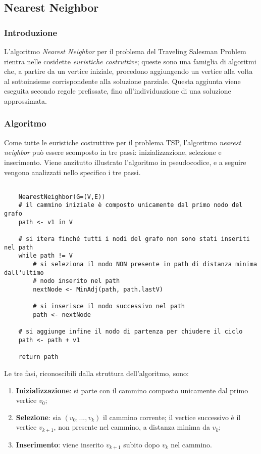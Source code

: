 \subsection{Nearest Neighbor}

\subsubsection{Introduzione}

L'algoritmo \textit{Nearest Neighbor} per il problema del Traveling Salesman Problem rientra nelle cosidette \textit{euristiche costruttive}; queste sono una famiglia di algoritmi che, a partire da un vertice iniziale, procedono aggiungendo un vertice alla volta al sottoinsieme corrispondente alla soluzione parziale. Questa aggiunta viene eseguita secondo regole prefissate, fino all'individuazione di una soluzione approssimata.

\subsubsection{Algoritmo}

Come tutte le euristiche costruttive per il problema TSP, l'algoritmo \textit{nearest neighbor} può essere scomposto in tre passi: inizializzazione, selezione e inserimento. Viene anzitutto illustrato l'algoritmo in pseudocodice, e a seguire vengono analizzati nello specifico i tre passi.

\begin{verbatim}

    NearestNeighbor(G=(V,E))
    # il cammino iniziale è composto unicamente dal primo nodo del grafo
    path <- v1 in V

    # si itera finché tutti i nodi del grafo non sono stati inseriti nel path
    while path != V 
        # si seleziona il nodo NON presente in path di distanza minima dall'ultimo
        # nodo inserito nel path
        nextNode <- MinAdj(path, path.lastV)

        # si inserisce il nodo successivo nel path
        path <- nextNode
    
    # si aggiunge infine il nodo di partenza per chiudere il ciclo
    path <- path + v1

    return path
\end{verbatim}

Le tre fasi, riconoscibili dalla struttura dell'algoritmo, sono:
\begin{enumerate}
    \item \textbf{Inizializzazione}: si parte con il cammino composto unicamente dal primo vertice $v_0$;
    \item \textbf{Selezione}: sia $(v_0,...,v_k)$ il cammino corrente; il vertice successivo è il vertice $v_{k+1}$, non presente nel cammino, a distanza minima da $v_k$;
    \item \textbf{Inserimento}: viene inserito $v_{k+1}$ subito dopo $v_k$ nel cammino.
\end{enumerate}

